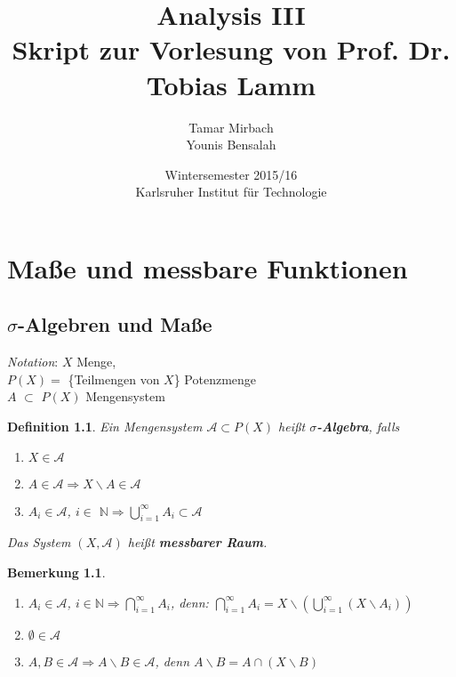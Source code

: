 \documentclass[11pt]{memoir}
\theoremstyle{changebreak}
\newtheorem{Definition}{Definition}[chapter]
\newtheorem{Bemerkung}{Bemerkung}[chapter]
\begin{document}
\title{\textbf{Analysis III}\\ Skript zur Vorlesung von Prof. Dr. Tobias Lamm}
\author{Tamar Mirbach\\ Younis Bensalah}
\date{Wintersemester 2015/16\\ Karlsruher Institut für Technologie}

\maketitle

\chapter{Maße und messbare Funktionen}
\section{$\sigma$-Algebren und Maße}


\emph{Notation}: $X$ Menge, \\ $P(X) =$ \{Teilmengen von $X$\}  \; Potenzmenge \\
$A$ $\subset$  $P(X)$ Mengensystem

\begin{Definition}
Ein Mengensystem $\mathscr{A} \subset P(X)$ heißt \textbf{$\sigma$-Algebra}, falls
\begin{enumerate}
	\item $X \in \mathscr{A}$
	\item $A \in \mathscr{A} \Rightarrow X \backslash A \in \mathscr{A}$
	\item $A_i \in \mathscr{A}$, $i \in$ $\mathbb{N} \Rightarrow \bigcup_{i = 1}^{\infty} A_i \subset \mathscr A$
\end{enumerate}
Das System $(X, \mathscr{A})$ heißt \textbf{messbarer Raum}.
\end{Definition}

\begin{Bemerkung}
\begin{enumerate}
	\item $A_i \in \mathscr{A}$, $i \in \mathbb{N} \Rightarrow \bigcap_{i = 1}^{\infty} A_i$, \quad denn:
	$\bigcap_{i=1}^{\infty} A_i  = X \backslash \left(\bigcup_{i=1}^{\infty} (X \backslash A_i)\right)$
	\item $\emptyset \in \mathscr{A}$
	\item $A, B \in \mathscr{A} \Rightarrow A \backslash B \in \mathscr{A}$, denn $A \backslash B = A \cap (X \backslash B)$
\end{enumerate}
\end{Bemerkung}
\end{document}
